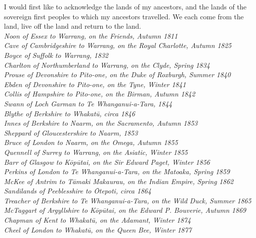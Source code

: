 \documentclass[
  a4paper,
]{scrbook}
\begin{document}
I would first like to acknowledge the lands of my ancestors, and the lands of the sovereign first peoples to which my ancestors travelled. We each come from the land, live off the land and return to the land.\\[5pt]
\textit{Noon of Essex to Warrang, on the Friends, Autumn 1811} \\[5pt]
\textit{Cave of Cambridgeshire to Warrang, on the Royal Charlotte, Autumn 1825} \\[5pt]
\textit{Boyce of Suffolk to Warrang, 1832} \\[5pt] 
\textit{Charlton of Northumberland to Warrang, on the Clyde, Spring 1834} \\[5pt]
\textit{Prouse of Devonshire to Pito-one, on the Duke of Roxburgh, Summer 1840} \\[5pt]
\textit{Ebden of Devonshire to Pito-one, on the Tyne, Winter 1841} \\[5pt]
\textit{Collis of Hampshire to Pito-one, on the Birman, Autumn 1842} \\[5pt]
\textit{Swann of Loch Garman to Te Whanganui-a-Tara, 1844} \\[5pt] 
\textit{Blythe of Berkshire to Whakatū, circa 1846} \\[5pt]
\textit{Innes of Berkshire to Naarm, on the Sacramento, Autumn 1853} \\[5pt]
\textit{Sheppard of Gloucestershire to Naarm, 1853} \\[5pt] 
\textit{Bruce of London to Naarm, on the Omega, Autumn 1855} \\[5pt]
\textit{Quennell of Surrey to Warrang, on the Asiatic, Winter 1855} \\[5pt]
\textit{Barr of Glasgow to Kōpūtai, on the Sir Edward Paget, Winter 1856} \\[5pt] 
\textit{Perkins of London to Te Whanganui-a-Tara, on the Matoaka, Spring 1859} \\[5pt]
\textit{McKee of Antrim to Tāmaki Makaurau, on the Indian Empire, Spring 1862} \\[5pt]
\textit{Sandilands of Peeblesshire to Ōtepoti, circa 1864} \\[5pt] 
\textit{Treacher of Berkshire to Te Whanganui-a-Tara, on the Wild Duck, Summer 1865} \\[5pt]
\textit{McTaggart of Argyllshire to Kōpūtai, on the Edward P. Bouverie, Autumn 1869} \\[5pt] 
\textit{Chapman of Kent to Whakatū, on the Adamant, Winter 1874} \\[5pt]
\textit{Cheel of London to Whakatū, on the Queen Bee, Winter 1877} \\[5pt]  
\end{document}
